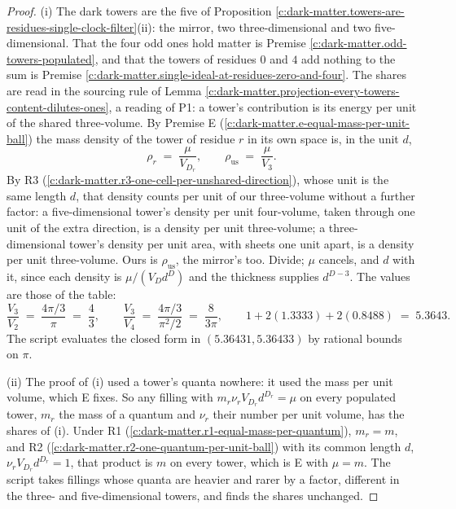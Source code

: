 \documentclass[11pt]{article}
\theoremstyle{definition}
\theoremstyle{plain}
\begin{document}
\begin{proof}
(i) The dark towers are the five of Proposition \ref{c:dark-matter.towers-are-residues-single-clock-filter}(ii): the mirror, two three-dimensional and two five-dimensional. That the four odd ones hold matter is Premise \ref{c:dark-matter.odd-towers-populated}, and that the towers of residues $0$ and $4$ add nothing to the sum is Premise \ref{c:dark-matter.single-ideal-at-residues-zero-and-four}. The shares are read in the sourcing rule of Lemma \ref{c:dark-matter.projection-every-towers-content-dilutes-ones}, a reading of P1: a tower's contribution is its energy per unit of the shared three-volume. By Premise E (\ref{c:dark-matter.e-equal-mass-per-unit-ball}) the mass density of the tower of residue $r$ in its own space is, in the unit $d$,
\[
\rho_{r} \;=\; \frac{\mu}{V_{D_{r}}}, \qquad \rho_{\mathrm{us}} \;=\; \frac{\mu}{V_{3}}.
\]
By R3 (\ref{c:dark-matter.r3-one-cell-per-unshared-direction}), whose unit is the same length $d$, that density counts per unit of our three-volume without a further factor: a five-dimensional tower's density per unit four-volume, taken through one unit of the extra direction, is a density per unit three-volume; a three-dimensional tower's density per unit area, with sheets one unit apart, is a density per unit three-volume. Ours is $\rho_{\mathrm{us}}$, the mirror's too. Divide; $\mu$ cancels, and $d$ with it, since each density is $\mu/(V_{D}d^{D})$ and the thickness supplies $d^{D-3}$. The values are those of the table:
\[
\frac{V_{3}}{V_{2}} \;=\; \frac{4\pi/3}{\pi} \;=\; \frac{4}{3}, \qquad
\frac{V_{3}}{V_{4}} \;=\; \frac{4\pi/3}{\pi^{2}/2} \;=\; \frac{8}{3\pi}, \qquad
1 + 2(1.3333) + 2(0.8488) \;=\; 5.3643 .
\]
The script evaluates the closed form in $(5.36431, 5.36433)$ by rational bounds on $\pi$.

(ii) The proof of (i) used a tower's quanta nowhere: it used the mass per unit volume, which E fixes. So any filling with $m_{r}\nu_{r}V_{D_{r}}d^{D_{r}} = \mu$ on every populated tower, $m_{r}$ the mass of a quantum and $\nu_{r}$ their number per unit volume, has the shares of (i). Under R1 (\ref{c:dark-matter.r1-equal-mass-per-quantum}), $m_{r} = m$, and R2 (\ref{c:dark-matter.r2-one-quantum-per-unit-ball}) with its common length $d$, $\nu_{r}V_{D_{r}}d^{D_{r}} = 1$, that product is $m$ on every tower, which is E with $\mu = m$. The script takes fillings whose quanta are heavier and rarer by a factor, different in the three- and five-dimensional towers, and finds the shares unchanged.


\end{proof}
\end{document}
